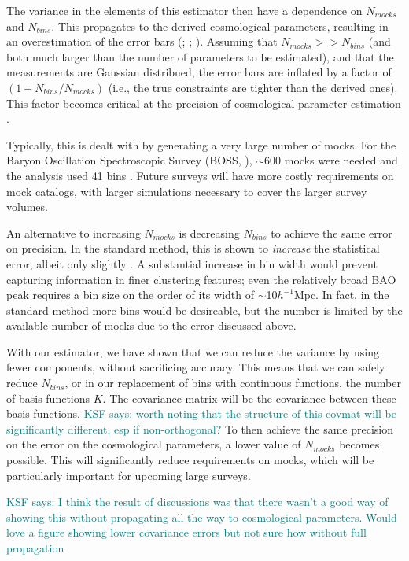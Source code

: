 \documentclass[modern]{aastex62}
\newcommand{\hmpc}{$h^{-1}$Mpc}
\newcommand{\KSF}[1]{\textcolor{teal}{KSF says: #1}}
\begin{document}
The variance in the elements of this estimator then have a dependence on $N_{mocks}$ and $N_{bins}$.
This propagates to the derived cosmological parameters, resulting in an overestimation of the error bars (\citealt{Hartlap2007}; \citealt{Dodelson2013} \citealt{Percival2014}; \citealt{TaylorJoachimi2014}).
Assuming that $N_{mocks} >> N_{bins}$ (and both much larger than the number of parameters to be estimated), and that the measurements are Gaussian distribued, the error bars are inflated by a factor of $(1 + N_{bins}/N_{mocks})$ (i.e., the true constraints are tighter than the derived ones).
This factor becomes critical at the precision of cosmological parameter estimation \citep{Percival2014}.

Typically, this is dealt with by generating a very large number of mocks.
For the Baryon Oscillation Spectroscopic Survey (BOSS, \citealt{Dawson2013}), $\sim$600 mocks were needed and the analysis used 41 bins \citep{Sanchez2012}.
Future surveys will have more costly requirements on mock catalogs, with larger simulations necessary to cover the larger survey volumes.

An alternative to increasing $N_{mocks}$ is decreasing $N_{bins}$ to achieve the same error on precision.
In the standard method, this is shown to \emph{increase} the statistical error, albeit only slightly \cite{Percival2014}.
A substantial increase in bin width would prevent capturing information in finer clustering features; even the relatively broad BAO peak requires a bin size on the order of its width of $\sim$10\hmpc.
In fact, in the standard method more bins would be desireable, but the number is limited by the available number of mocks due to the error discussed above.

With our estimator, we have shown that we can reduce the variance by using fewer components, without sacrificing accuracy.
This means that we can safely reduce $N_{bins}$, or in our replacement of bins with continuous functions, the number of basis functions $K$.
The covariance matrix will be the covariance between these basis functions. \KSF{worth noting that the structure of this covmat will be significantly different, esp if non-orthogonal?}
To then achieve the same precision on the error on the cosmological parameters, a lower value of $N_{mocks}$ becomes possible.
This will significantly reduce requirements on mocks, which will be particularly important for upcoming large surveys. 

\KSF{I think the result of discussions was that there wasn't a good way of showing this without propagating all the way to cosmological parameters. Would love a figure showing lower covariance errors but not sure how without full propagation}
\end{document}
